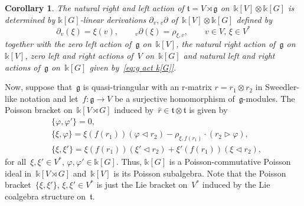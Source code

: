 \documentclass[12pt, reqno]{amsart}
\newcommand{\wh}[1]{\widehat{#1}}
\newtheorem{corollary}[theorem]{Corollary}
\theoremstyle{definition}
\numberwithin{equation}{section}
\newcommand{\tensor}{\otimes}
\newcommand{\kk}{\mathbb{k}}\newcommand{\lie}[1]{{\mathfrak{#1}}}
\begin{document}
\begin{corollary}
The natural right and left action of
$\lie t=V\rtimes \lie g$ on~$\kk[V]\tensor\kk[G]$ is determined by $\kk[G]$-linear derivations 
$\partial_v,{}_v\partial$ of~$\kk[V]\tensor\kk[G]$
defined by
$$
\partial_v(\xi)=\xi(v),\qquad {}_v\partial(\xi)=\rho_{\xi,v},\qquad 
v\in V,\, \xi\in V^*
$$
together with the zero left action of~$\lie g$ on~$\kk[V]$, the natural right action of~$\lie g$
on~$\kk[V]$, zero left and right actions of~$V$ on~$\kk[G]$ and natural left and right actions of~$\lie g$
on~$\kk[G]$ given by~\eqref{eq:g act k[G]}.
\end{corollary}
















Now, suppose that~$\lie g$ is quasi-triangular with an r-matrix $r=r_1\tensor r_2$ in Sweedler-like notation and let~$f:\lie g\to V$ be a surjective homomorphism of~$\lie g$-modules. The Poisson 
bracket on~$\kk[V\rtimes G]$ induced by~$\wh r\in\lie t\tensor\lie t$ is  given by
\begin{align*}
&\{\varphi,\varphi'\}=0,\\
&\{\xi,\varphi\}=\xi(f(r_1))(\varphi\triangleleft r_2)-
\rho_{\xi,f(r_1)}\cdot(r_2\triangleright \varphi),\\
&\{\xi,\xi'\}=\xi(f(r_1))(\xi'\triangleleft r_2)+\xi'(f(r_1))(\xi\triangleleft r_2),
\end{align*}
for all~$\xi,\xi'\in V^*$, $\varphi,\varphi'\in\kk[G]$. Thus, $\kk[G]$
is a Poisson-commutative Poisson ideal in~$\kk[V\rtimes G]$ and~$\kk[V]$
is its Poisson subalgebra. Note that the Poisson
bracket~$\{\xi,\xi'\}$, $\xi,\xi'\in V^*$ is just the Lie bracket
on~$V^*$ induced by the Lie coalgebra structure
on~$\lie t$.
\end{document}

